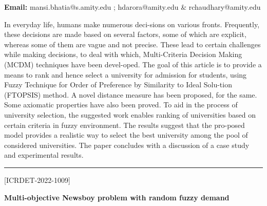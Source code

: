 \documentclass[twoside,11pt]{amsart}
\begin{document}
\vskip 2mm
\begin{flushleft}
{\bf Email:} mansi.bhatia@s.amity.edu ; hdarora@amity.edu \& rchaudhary@amity.edu
\end{flushleft}
\vskip 5mm
In everyday life, humans make numerous deci-sions on various fronts. Frequently, these decisions are made based on several factors, some of which are explicit, whereas some of them are vague and not precise. These lead to certain challenges while making decisions, to deal with which, Multi-Criteria Decision Making (MCDM) techniques have been devel-oped. The goal of this article is to provide a means to rank and hence select a university for admission for students, using Fuzzy Technique for Order of Preference by Similarity to Ideal Solu-tion (FTOPSIS) method. A novel distance measure has been proposed, for the same. Some axiomatic properties have also been proved. To aid in the process of university selection, the suggested work enables ranking of universities based on certain criteria in fuzzy environment. The results suggest that the pro-posed model provides a realistic way to select the best university among the pool of considered universities. The paper concludes with a discussion of a case study and experimental results.
\vskip 5mm
\rule{\textwidth}{0.5pt}
\vskip 5mm
\begin{flushleft}
\centerline{[ICRDET-2022-1009]}
\end{flushleft}
\begin{center}\bf\LARGE
Multi-objective Newsboy problem with random fuzzy demand
\end{center}
\vskip 5mm
\end{document}
